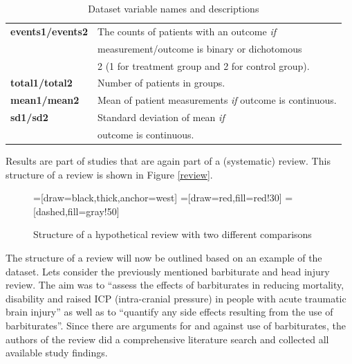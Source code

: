 \documentclass[11pt,a4paper,twoside]{book}\usepackage[]{graphicx}\usepackage[]{color}
\begin{document}
\begin{table}[ht]
\begin{center}
\begin{tabular}{l l}
      \textbf{events1/events2} & The counts of patients with an outcome \textit{if}\\ &measurement/outcome is binary or dichotomous \\ &2 (1 for treatment group and 2 for control group).\\
      \textbf{total1/total2} & Number of patients in groups.\\
      \textbf{mean1/mean2} & Mean of patient measurements \textit{if} outcome is continuous.\\
      \textbf{sd1/sd2} & Standard deviation of mean \textit{if} \\ &outcome is continuous.
    \end{tabular}
  \caption{Dataset variable names and descriptions  \label{variable}}

  \end{center}
\end{table}

Results are part of studies that are again part of a (systematic) review. This structure of a review is shown in Figure \ref{review}. 

\begin{figure}
=[draw=black,thick,anchor=west]
=[draw=red,fill=red!30]
=[dashed,fill=gray!50]
\caption{Structure of a hypothetical review with two different comparisons\label{review.structure}}
\label{review.structure}
\end{figure}

\vspace{0mm}
The structure of a review will now be outlined based on an example of the dataset. Lets consider the previously mentioned barbiturate and head injury review. The aim was to ``assess the effects of barbiturates in reducing mortality, disability and raised ICP (intra-cranial pressure) in people with acute traumatic brain injury'' as well as to ``quantify any side effects resulting from the use of barbiturates''. Since there are arguments for and against use of barbiturates, the authors of the review did a comprehensive literature search and collected all available study findings.
\end{document}
